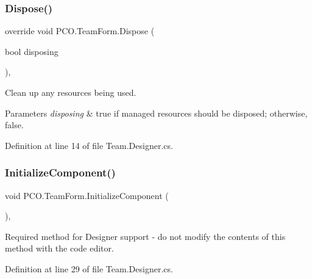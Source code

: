 \mbox{\label{classPCO_1_1TeamForm_a38178ba43659815e97c67f01bb13f6a7}} 
\subsubsection{\texorpdfstring{Dispose()}{Dispose()}}
{\footnotesize\ttfamily override void P\+C\+O.\+Team\+Form.\+Dispose (\begin{DoxyParamCaption}\item[{bool}]{disposing }\end{DoxyParamCaption})\hspace{0.3cm}{\ttfamily [inline]}, {\ttfamily [protected]}}



Clean up any resources being used. 


\begin{DoxyParams}{Parameters}
{\em disposing} & true if managed resources should be disposed; otherwise, false.\\
\hline
\end{DoxyParams}


Definition at line 14 of file Team.\+Designer.\+cs.

\mbox{\label{classPCO_1_1TeamForm_a2748b745e9cf7e117c393a42e38aec5a}} 
\subsubsection{\texorpdfstring{Initialize\+Component()}{InitializeComponent()}}
{\footnotesize\ttfamily void P\+C\+O.\+Team\+Form.\+Initialize\+Component (\begin{DoxyParamCaption}{ }\end{DoxyParamCaption})\hspace{0.3cm}{\ttfamily [inline]}, {\ttfamily [private]}}



Required method for Designer support -\/ do not modify the contents of this method with the code editor. 



Definition at line 29 of file Team.\+Designer.\+cs.

